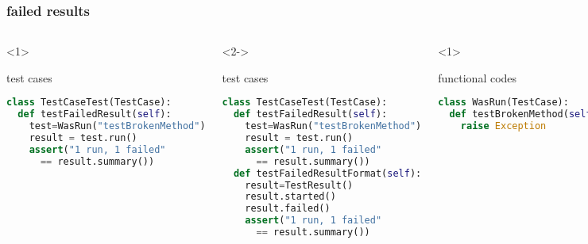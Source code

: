 \documentclass[lualatex]{beamer}
\begin{document}
\begin{frame}[fragile,t]
    \frametitle{failed results}

    \begin{columns}[t]
        \small
        \begin{onlyenv}<1>
            \begin{block}{test cases}
                \begin{lstlisting}[language=Python,columns=fullflexible]
class TestCaseTest(TestCase):
  def testFailedResult(self):
    test=WasRun("testBrokenMethod")
    result = test.run()
    assert("1 run, 1 failed"
      == result.summary())
                \end{lstlisting}
            \end{block}
        \end{onlyenv}

        \begin{onlyenv}<2->
            \begin{block}{test cases}
                \begin{lstlisting}[language=Python,columns=fullflexible]
class TestCaseTest(TestCase):
  def testFailedResult(self):
    test=WasRun("testBrokenMethod")
    result = test.run()
    assert("1 run, 1 failed"
      == result.summary())
  def testFailedResultFormat(self):
    result=TestResult()
    result.started()
    result.failed()
    assert("1 run, 1 failed"
      == result.summary())
                \end{lstlisting}
            \end{block}
        \end{onlyenv}

        \begin{onlyenv}<1>
            \begin{block}{functional codes}
                \begin{lstlisting}[language=Python,columns=fullflexible]
class WasRun(TestCase):
  def testBrokenMethod(self):
    raise Exception
                \end{lstlisting}
            \end{block}
        \end{onlyenv}

        \begin{onlyenv}<2>
            \begin{block}{functional codes}
                \begin{lstlisting}[language=Python,columns=fullflexible]
class TestResult:
  def __init__(self):
    self.run=0
    self.failed=0
  def failed(self):
    self.failed=self.failed+1
  def summary(self):
    return "%d run, %d failed"
        % (self.run, self.failed)
                \end{lstlisting}
            \end{block}
        \end{onlyenv}


\end{columns}
\end{frame}
\end{document}

